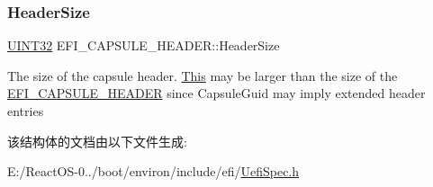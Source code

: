 \subsubsection{\texorpdfstring{Header\+Size}{HeaderSize}}
{\footnotesize\ttfamily \hyperlink{_processor_bind_8h_ae1e6edbbc26d6fbc71a90190d0266018}{U\+I\+N\+T32} E\+F\+I\+\_\+\+C\+A\+P\+S\+U\+L\+E\+\_\+\+H\+E\+A\+D\+E\+R\+::\+Header\+Size}

The size of the capsule header. \hyperlink{namespace_this}{This} may be larger than the size of the \hyperlink{struct_e_f_i___c_a_p_s_u_l_e___h_e_a_d_e_r}{E\+F\+I\+\_\+\+C\+A\+P\+S\+U\+L\+E\+\_\+\+H\+E\+A\+D\+ER} since Capsule\+Guid may imply extended header entries 

该结构体的文档由以下文件生成\+:\begin{DoxyCompactItemize}
\item 
E\+:/\+React\+O\+S-\/0../boot/environ/include/efi/\hyperlink{_uefi_spec_8h}{Uefi\+Spec.\+h}\end{DoxyCompactItemize}
